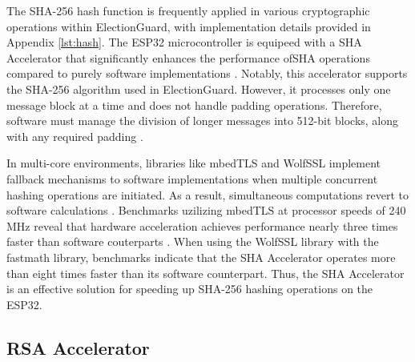 The SHA-256 hash function is frequently applied in various cryptographic operations within ElectionGuard, with implementation details provided in Appendix \ref{lst:hash}. The ESP32 microcontroller is equipeed with a \ac{SHA} Accelerator that significantly enhances the performance of\ac{SHA} operations compared to purely software implementations \cite[589]{esp32-ref}. Notably, this accelerator supports the SHA-256 algorithm used in ElectionGuard. However, it processes only one message block at a time and does not handle padding operations. Therefore, software must manage the division of longer messages into 512-bit blocks, along with any required padding \cite[2]{esp32-series}. 

In multi-core environments, libraries like mbedTLS and WolfSSL implement fallback mechanisms to software implementations when multiple concurrent hashing operations are initiated. As a result, simultaneous computations revert to software calculations \cite{mbedTLS-fork} \cite{wolfSSL-port}. Benchmarks uzilizing mbedTLS at processor speeds of 240 MHz reveal that hardware acceleration achieves performance nearly three times faster than software couterparts \cite[41-42]{eval-crypto}. When using the WolfSSL library with the fastmath library, benchmarks indicate that the \ac{SHA} Accelerator operates more than eight times faster than its software counterpart. Thus, the \ac{SHA} Accelerator is an effective solution for speeding up SHA-256 hashing operations on the ESP32.

\subsection{\ac{RSA} Accelerator}

